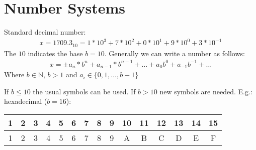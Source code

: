 \chapter{Number Systems}\label{ch:number-systems}
Standard decimal number:
\begin{align*}
    x = 1709.3_{10} = 1 * 10^{3} + 7 * 10^2 + 0*10^1+9*10^0+3*10^{-1}
\end{align*}
The $10$ indicates the base $b=10$.
Generally we can write a number as follows:
\begin{align*}
    x =\pm a_n*b^n+a_{n-1}*b^{n-1}+\ldots+a_0 b^0+a_{-1}b^{-1}+\ldots
\end{align*}
Where $b \in \mathbb{N}$, $b>1$ and $a_i \in \{0,1, \dots, b-1\}$

If $b \leq 10$ the usual symbols can be used.
If $b>10$ new symbols are needed.
E.g.: hexadecimal ($b=16$):

\begin{center}
    \begin{tabular}{ c | c| c |c| c| c| c| c| c| c| c| c| c| c| c}
        1 & 2 & 3 & 4 & 5 & 6 & 7 & 8 & 9 & 10 & 11 & 12 & 13 & 14 & 15 \\
        \hline
        1 & 2 & 3 & 4 & 5 & 6 & 7 & 8 & 9 & A  & B  & C  & D  & E  & F  \\
    \end{tabular}
\end{center}


